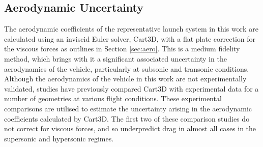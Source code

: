 \subsection{Aerodynamic Uncertainty}



The aerodynamic coefficients of the representative launch system in this work are calculated using an inviscid Euler solver, Cart3D, with a flat plate correction for the viscous forces as outlines in Section \ref{sec:aero}. This is a medium fidelity method, which brings with it a significant associated uncertainty in the aerodynamics of the vehicle, particularly at subsonic and transonic conditions. Although the aerodynamics of the vehicle in this work are not experimentally validated, studies have previously compared Cart3D with experimental data for a number of geometries at various flight conditions. These experimental comparisons are utilised to estimate the uncertainty arising in the aerodynamic coefficients calculated by Cart3D. The first two of these comparison studies do not correct for viscous forces, and so underpredict drag in almost all cases in the supersonic and hypersonic regimes.




